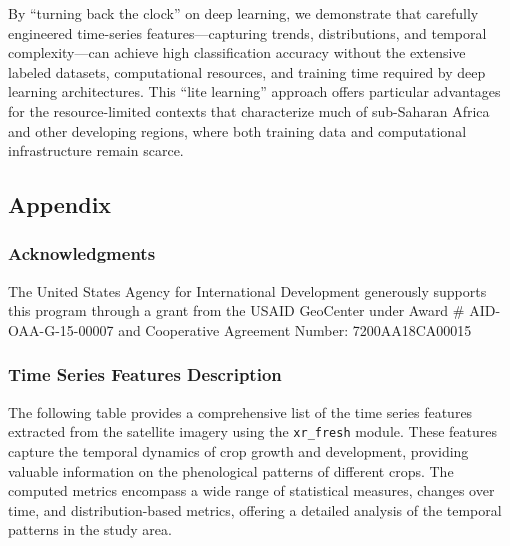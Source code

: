 \documentclass[
  journal,
  twocolumn]{IEEEtran}
\begin{document}
By ``turning back the clock'' on deep learning, we demonstrate that
carefully engineered time-series features---capturing trends,
distributions, and temporal complexity---can achieve high classification
accuracy without the extensive labeled datasets, computational
resources, and training time required by deep learning architectures.
This ``lite learning'' approach offers particular advantages for the
resource-limited contexts that characterize much of sub-Saharan Africa
and other developing regions, where both training data and computational
infrastructure remain scarce.

\newpage

\hypertarget{appendix}{%
\subsection{Appendix}\label{appendix}}

\hypertarget{acknowledgments}{%
\subsubsection{Acknowledgments}\label{acknowledgments}}

The United States Agency for International Development generously
supports this program through a grant from the USAID GeoCenter under
Award \# AID-OAA-G-15-00007 and Cooperative Agreement Number:
7200AA18CA00015

\hypertarget{time-series-features-description}{%
\subsubsection{Time Series Features
Description}\label{time-series-features-description}}

The following table provides a comprehensive list of the time series
features extracted from the satellite imagery using the
\texttt{xr\_fresh} module. These features capture the temporal dynamics
of crop growth and development, providing valuable information on the
phenological patterns of different crops. The computed metrics encompass
a wide range of statistical measures, changes over time, and
distribution-based metrics, offering a detailed analysis of the temporal
patterns in the study area.
\end{document}
